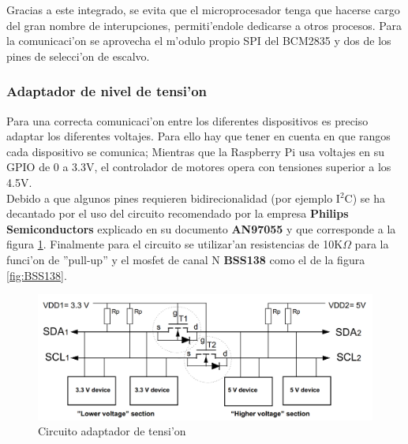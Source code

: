 \documentclass[twoside,12pt]{article}
\begin{document}
Gracias a este integrado, se evita que el microprocesador tenga que hacerse cargo del gran nombre de interupciones, permiti'endole dedicarse a otros procesos. Para la comunicaci'on se aprovecha el m'odulo propio SPI del BCM2835 y dos de los pines de selecci'on de escalvo. 

\subsubsection{Adaptador de nivel de tensi'on}
Para una correcta comunicaci'on entre los diferentes dispositivos es preciso adaptar los diferentes voltajes. Para ello hay que tener en cuenta en que rangos cada dispositivo se comunica; Mientras que la Raspberry Pi usa voltajes en su GPIO de 0 a 3.3V, el controlador de motores opera con tensiones superior a los 4.5V.\\

Debido a que algunos pines requieren bidirecionalidad (por ejemplo I${^2}$C) se ha decantado por el uso del circuito recomendado por la empresa \textbf{Philips Semiconductors} explicado en su documento \textbf{AN97055} y que corresponde a la figura \ref{fig:Level_shifter_circuit}. Finalmente para el circuito se utilizar'an resistencias de 10K$\Omega$ para la funci'on de ''pull-up'' y el mosfet de canal N \textbf{BSS138} como el de la figura \ref{fig:BSS138}.

\begin{figure}[ht]
\centering
\includegraphics[scale=0.30]{images/level_shifter_circuit.png}
\caption{Circuito adaptador de tensi'on}
\label{fig:Level_shifter_circuit}
\end{figure} 
\end{document}
